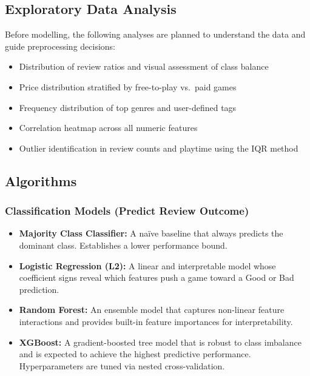 \documentclass[11pt, a4paper]{article}
\begin{document}
\subsection{Exploratory Data Analysis}

Before modelling, the following analyses are planned to understand the data and
guide preprocessing decisions:

\begin{itemize}
  \item Distribution of review ratios and visual assessment of class balance
  \item Price distribution stratified by free-to-play vs.\ paid games
  \item Frequency distribution of top genres and user-defined tags
  \item Correlation heatmap across all numeric features
  \item Outlier identification in review counts and playtime using the IQR method
\end{itemize}

\subsection{Algorithms}

\subsubsection{Classification Models (Predict Review Outcome)}

\begin{itemize}
  \item \textbf{Majority Class Classifier:} A na\"{i}ve baseline that always predicts
        the dominant class. Establishes a lower performance bound.
  \item \textbf{Logistic Regression (L2):} A linear and interpretable model whose
        coefficient signs reveal which features push a game toward a Good or Bad
        prediction.
  \item \textbf{Random Forest:} An ensemble model that captures non-linear feature
        interactions and provides built-in feature importances for interpretability.
  \item \textbf{XGBoost:} A gradient-boosted tree model that is robust to class
        imbalance and is expected to achieve the highest predictive performance.
        Hyperparameters are tuned via nested cross-validation.
\end{itemize}
\end{document}

